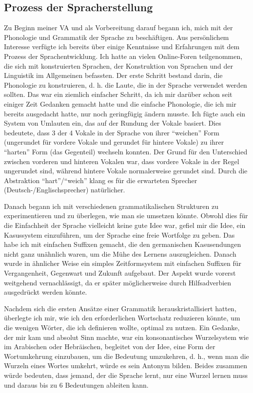 \documentclass{article}
\begin{document}
\subsection{Prozess der Spracherstellung}
Zu Beginn meiner VA und als Vorbereitung darauf begann ich, mich mit der Phonologie und Grammatik der Sprache zu beschäftigen.
Aus persönlichem Interesse verfügte ich bereits über einige Kenntnisse und Erfahrungen mit dem Prozess der Sprachentwicklung.
Ich hatte an vielen Online-Foren teilgenommen, die sich mit konstruierten Sprachen, der Konstruktion von Sprachen und der
Linguistik im Allgemeinen befassten. Der erste Schritt bestand darin, die Phonologie zu konstruieren, d. h. die Laute,
die in der Sprache verwendet werden sollten. Das war ein ziemlich einfacher Schritt, da ich mir darüber schon seit einiger
Zeit Gedanken gemacht hatte und die einfache Phonologie, die ich mir bereits ausgedacht hatte, nur noch geringfügig ändern musste.
Ich fügte auch ein System von Umlauten ein, das auf der Rundung der Vokale basiert. Dies bedeutete, dass 3 der 4 Vokale
in der Sprache von ihrer ``weichen'' Form (ungerundet für vordere Vokale und gerundet für hintere Vokale) zu ihrer ``harten'' Form
(das Gegenteil) wechseln konnten. Der Grund für den Unterschied zwischen vorderen und hinteren Vokalen war, dass vordere Vokale
in der Regel ungerundet sind, während hintere Vokale normalerweise gerundet sind.\citep{Stevens72} Durch die Abstraktion
``hart''/``weich'' klang es für die erwarteten Sprecher (Deutsch-/Englischsprecher) natürlicher.

Danach begann ich mit verschiedenen grammatikalischen Strukturen zu experimentieren und zu überlegen,
wie man sie umsetzen könnte. Obwohl dies für die Einfachheit der Sprache vielleicht keine gute Idee war,
gefiel mir die Idee, ein Kasussystem einzuführen, um der Sprache eine freie Wortfolge zu geben.
Das habe ich mit einfachen Suffixen gemacht, die den germanischen Kasusendungen nicht ganz unähnlich waren,
um die Mühe des Lernens auszugleichen. Danach wurde in ähnlicher Weise ein simples Zeitformsystem mit einfachen Suffixen
für Vergangenheit, Gegenwart und Zukunft aufgebaut. Der Aspekt wurde vorerst weitgehend vernachlässigt, da er später
möglicherweise durch Hilfsadverbien ausgedrückt werden könnte.

Nachdem sich die ersten Ansätze einer Grammatik herauskristallisiert hatten, überlegte ich mir,
wie ich den erforderlichen Wortschatz reduzieren könnte, um die wenigen Wörter, die ich definieren wollte,
optimal zu nutzen. Ein Gedanke, der mir kam und absolut Sinn machte, war ein konsonantisches Wurzelsystem wie im Arabischen
oder Hebräischen, begleitet von der Idee, eine Form der Wortumkehrung einzubauen, um die Bedeutung umzukehren, d. h.,
wenn man die Wurzeln eines Wortes umkehrt, würde es sein Antonym bilden. Beides zusammen würde bedeuten, dass jemand,
der die Sprache lernt, nur eine Wurzel lernen muss und daraus bis zu 6 Bedeutungen ableiten kann.
\end{document}
